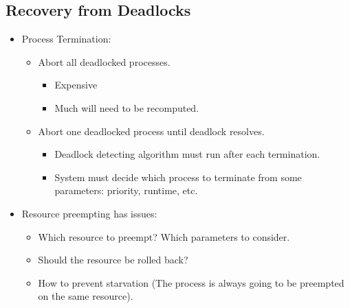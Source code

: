 \documentclass[a4wide,10pt]{article}
\begin{document}
\subsection{Recovery from Deadlocks} %
\label{sub:recovery_from_deadlocks}
\begin{itemize}
	\item Process Termination:
	\begin{itemize}
		\item Abort all deadlocked processes.
		\begin{itemize}
			\item Expensive
			\item Much will need to be recomputed.
		\end{itemize}
		\item Abort one deadlocked process until deadlock resolves.
		\begin{itemize}
			\item Deadlock detecting algorithm must run after each termination.
			\item System must decide which process to terminate from some parameters: priority, runtime, etc.
		\end{itemize}
	\end{itemize}
	\item Resource preempting has issues:
	\begin{itemize}
		\item Which resource to preempt? Which parameters to consider.
		\item Should the resource be rolled back?
		\item How to prevent starvation (The process is always going to be preempted on the same resource).
	\end{itemize}
\end{itemize}
\end{document}
